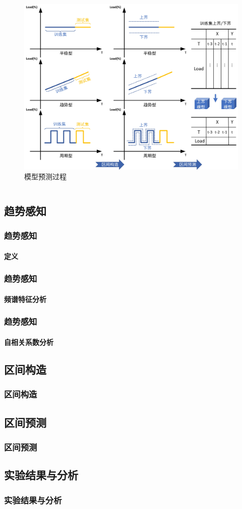 \begin{frame}
\begin{columns}
\begin{column}{0.6\textwidth}
\begin{figure}[htb]
\centering
\includegraphics[scale=0.38]{figures/fig7_predict_process.jpg}
\caption{模型预测过程}
\label{fig:fig6}
\end{figure}
\end{column}
\end{columns}
\end{frame}

\subsection{趋势感知}

\begin{frame}
\frametitle{趋势感知}
\framesubtitle{定义}
\end{frame}

\begin{frame}
\frametitle{趋势感知}
\framesubtitle{频谱特征分析}
\end{frame}

\begin{frame}
\frametitle{趋势感知}
\framesubtitle{自相关系数分析}
\end{frame}

\subsection{区间构造}

\begin{frame}
\frametitle{区间构造}
\end{frame}


\subsection{区间预测}

\begin{frame}
\frametitle{区间预测}
\end{frame}


\subsection{实验结果与分析}

\begin{frame}
\frametitle{实验结果与分析}
\end{frame}